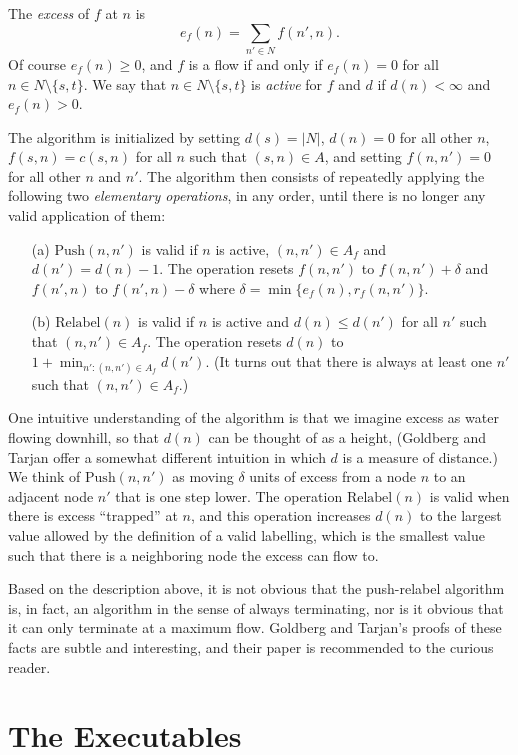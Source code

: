 \documentclass[12pt]{article}
\theoremstyle{definition}
\begin{document}
\begin{appendix}
The \emph{excess} of $f$ at $n$ is $$e_f(n) = \sum_{n' \in N}
f(n',n).$$ Of course $e_f(n) \ge 0$, and $f$ is a flow if and only if
$e_f(n) = 0$ for all $n \in N \setminus \{s,t\}$.  We say that $n \in
N \setminus \{s,t\}$ is \emph{active} for $f$ and $d$ if $d(n) <
\infty$ and $e_f(n) > 0$.

The algorithm is initialized by setting $d(s) = |N|$, $d(n) = 0$ for
all other $n$, $f(s,n) = c(s,n)$ for all $n$ such that $(s,n) \in A$,
and setting $f(n,n') = 0$ for all other $n$ and $n'$.  The algorithm
then consists of repeatedly applying the following two
\emph{elementary operations}, in any order, until there is no longer
any valid application of them:
\begin{enumerate}
  \item[(a)] $\mathrm{Push}(n,n')$ is valid if $n$ is active, $(n,n')
    \in A_f$ and $d(n') = d(n) - 1$.  The operation resets $f(n,n')$
    to $f(n,n') + \delta$ and $f(n',n)$ to $f(n',n) - \delta$ where
    $\delta = \min\{e_f(n),r_f(n,n')\}$.
  \item[(b)] $\mathrm{Relabel}(n)$ is valid if $n$ is active and $d(n)
    \le d(n')$ for all $n'$ such that $(n,n') \in A_f$.  The operation
    resets $d(n)$ to $1 + \min_{n' : (n,n') \in A_f} d(n')$.  (It
    turns out that there is always at least one $n'$ such that $(n,n')
    \in A_f$.)
\end{enumerate}
One intuitive understanding of the algorithm is that we imagine excess
as water flowing downhill, so that $d(n)$ can be thought of as a
height, (Goldberg and Tarjan offer a somewhat different intuition in
which $d$ is a measure of distance.) We think of $\mathrm{Push}(n,n')$
as moving $\delta$ units of excess from a node $n$ to an adjacent node
$n'$ that is one step lower.  The operation $\mathrm{Relabel}(n)$ is
valid when there is excess ``trapped'' at $n$, and this operation
increases $d(n)$ to the largest value allowed by the definition of a
valid labelling, which is the smallest value such that there is a
neighboring node the excess can flow to.

Based on the description above, it is not obvious that the
push-relabel algorithm is, in fact, an algorithm in the sense of
always terminating, nor is it obvious that it can only terminate at a
maximum flow.  Goldberg and Tarjan's proofs of these facts are subtle
and interesting, and their paper is recommended to the curious reader.

\section{The Executables}


\end{appendix}
\end{document}
